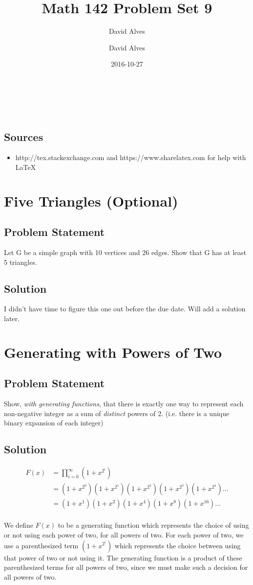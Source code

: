 \documentclass[12pt]{article}
\author{David Alves}
\title{Math 142 Problem Set 9}
\author{David Alves}
\date{2016-10-27}
\newcommand{\ProblemStatement}[1]{
\subsection*{Problem Statement}
#1
\subsection*{Solution}
}
\begin{document}

\begin{center}
\large \thetitle \\
\theauthor \\
\thedate
\end{center}

\subsection*{Sources}

    \begin{itemize}
    \item http://tex.stackexchange.com and https://www.sharelatex.com for help with \LaTeX
    \end{itemize}

\section{Five Triangles (Optional)}
\ProblemStatement{
Let G be a simple graph with 10 vertices and 26 edges. Show that G has at least 5 triangles.
}

I didn't have time to figure this one out before the due date. Will add a solution later.

\section{Generating with Powers of Two}
\ProblemStatement{
Show, \emph{with generating functions}, that there is exactly one way to represent each non-negative integer as a sum of \emph{distinct} powers of 2. (i.e. there is a unique binary expansion of each integer)
}

\begin{align*}
    F(x)&=\prod_{i=0}^{\infty}(1+x^{2^i})\\
    &=(1 + x^{2^0})(1 + x^{2^1})(1 + x^{2^2})(1+x^{2^3})(1+x^{2^4})\ldots \\
    &=(1 + x^1)(1 + x^2)(1 + x^4)(1+x^8)(1+x^{16})\ldots \\
\end{align*}

We define $F(x)$ to be a generating function which represents the choice of using or not using each power of two, for all powers of two. For each power of two, we use a parenthesized term $(1 + x^{2^i})$ which represents the choice between using that power of two  or not using it. The generating function is a product of these parenthesized terms for all powers of two, since we must make such a decision for all powers of two.
\end{document}
